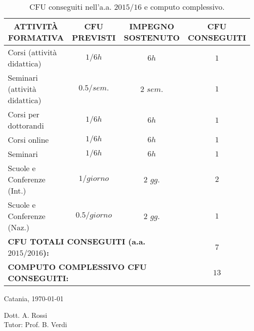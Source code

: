 \documentclass[a4paper,12pt]{article}
\begin{document}
\begin{table}[h]
    \begin{tiny}
        \centering
        \caption{CFU conseguiti nell'a.a. $2015/16$ e computo complessivo.}
            \begin{tabular}{|c|c||c|c|}
                 \hline
                 \textbf{ATTIVIT\`{A} FORMATIVA} & \textbf{CFU PREVISTI} & \textbf{IMPEGNO SOSTENUTO} & \textbf{CFU CONSEGUITI} \\ \hline\hline
                 \multicolumn{1}{|l|}{Corsi (attivit\`{a} didattica)} & $1/6h$ & $6h$ & $1$ \\ \hline
                 \multicolumn{1}{|l|}{Seminari (attivit\`{a} didattica)} & $0.5/sem.$ & $2$ $sem.$ & $1$ \\ \hline
                 \multicolumn{1}{|l|}{Corsi per dottorandi} & $1/6h$ & $6h$ & $1$ \\ \hline
                 \multicolumn{1}{|l|}{Corsi online} & $1/6h$ & $6h$ & $1$ \\ \hline
                 \multicolumn{1}{|l|}{Seminari} & $1/6h$ & $6h$ & $1$ \\ \hline
                 \multicolumn{1}{|l|}{Scuole e Conferenze (Int.)} & $1/giorno$ & $2$ $gg.$ & $2$ \\ \hline
                 \multicolumn{1}{|l|}{Scuole e Conferenze (Naz.)} & $0.5/giorno$ & $2$ $gg.$ & $1$ \\ \hline\hline
                 \multicolumn{3}{|l|}{\textbf{CFU TOTALI CONSEGUITI (a.a. $2015/2016$):}} & \textbf{$7$} \\ \hline\hline\hline
                 \multicolumn{3}{|l|}{\textbf{COMPUTO COMPLESSIVO CFU CONSEGUITI:}} & \textbf{$13$} \\
                 \hline
            \end{tabular}
    \end{tiny}
\end{table}


\vfill

\bigskip
Catania, \today
\bigskip

\begin{flushright}{Dott. A. Rossi \\ \bigskip Tutor: Prof. B. Verdi}
\end{flushright}

\pagebreak




\end{document}
